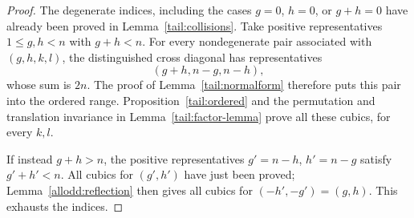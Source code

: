 \begin{proof}
The degenerate indices, including the cases $g=0$, $h=0$, or $g+h=0$ have
already been proved in Lemma~\ref{tail:collisions}.
Take positive representatives $1\le g,h<n$ with $g+h<n$.
For every nondegenerate pair associated with $(g,h,k,l)$, the
distinguished cross diagonal has representatives
\[
 (g+h,n-g,n-h),
\]
whose sum is $2n$.  The proof of Lemma~\ref{tail:normalform}
therefore puts this pair into the ordered range.  Proposition~\ref{tail:ordered} and
the permutation and translation invariance in
Lemma~\ref{tail:factor-lemma} prove all these cubics, for every $k,l$.

If instead $g+h>n$, the positive representatives
$g'=n-h$, $h'=n-g$ satisfy $g'+h'<n$.  All cubics for $(g',h')$
have just been proved; Lemma~\ref{allodd:reflection} then gives
all cubics for $(-h',-g')=(g,h)$.  This exhausts the indices.
\end{proof}

